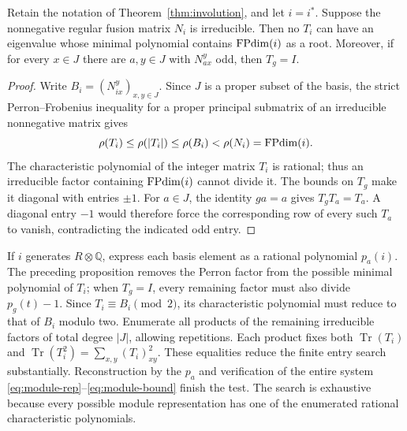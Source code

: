 \begin{proposition}\label{prop:module-perron}
Retain the notation of Theorem~\ref{thm:involution}, and let $i=i^*$.
Suppose the nonnegative regular fusion matrix $N_i$ is irreducible.
Then no $T_i$ can have an eigenvalue whose minimal polynomial contains
$\operatorname{FPdim}(i)$ as a root. Moreover, if for every $x\in J$ there are
$a,y\in J$ with $N_{ax}^{y}$ odd, then $T_g=I$.
\end{proposition}
\begin{proof}
Write $B_i=(N_{ix}^{y})_{x,y\in J}$. Since $J$ is a proper subset of
the basis, the strict Perron--Frobenius inequality for a proper principal
submatrix of an irreducible nonnegative matrix gives
\[
 \rho(T_i)\leq\rho(|T_i|)\leq\rho(B_i)<\rho(N_i)=\operatorname{FPdim}(i).
\]
The characteristic polynomial of the integer matrix $T_i$ is rational;
thus an irreducible factor containing $\operatorname{FPdim}(i)$ cannot divide it.
The bounds on $T_g$ make it diagonal with entries $\pm1$.
For $a\in J$, the identity $ga=a$ gives $T_gT_a=T_a$.
A diagonal entry $-1$ would therefore force the corresponding row of
every such $T_a$ to vanish, contradicting the indicated odd entry.
\end{proof}

If $i$ generates $R\otimes\mathbb Q$, express each basis element as a
rational polynomial $p_a(i)$. The preceding proposition removes the
Perron factor from the possible minimal polynomial of $T_i$; when
$T_g=I$, every remaining factor must also divide $p_g(t)-1$.
Since $T_i\equiv B_i\pmod2$, its characteristic polynomial must reduce
to that of $B_i$ modulo two. Enumerate all products of the remaining
irreducible factors of total degree $|J|$, allowing repetitions. Each
product fixes both $\operatorname{Tr}(T_i)$ and
$\operatorname{Tr}(T_i^2)=\sum_{x,y}(T_i)_{xy}^2$.
These equalities reduce the finite entry search substantially.
Reconstruction by the $p_a$ and verification of the entire system
\eqref{eq:module-rep}--\eqref{eq:module-bound} finish the test.
The search is exhaustive because every possible module representation
has one of the enumerated rational characteristic polynomials.

